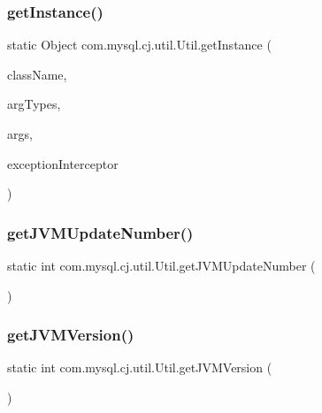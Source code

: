 \subsubsection{\texorpdfstring{get\+Instance()}{getInstance()}\hspace{0.1cm}{\footnotesize\ttfamily [2/2]}}
{\footnotesize\ttfamily static Object com.\+mysql.\+cj.\+util.\+Util.\+get\+Instance (\begin{DoxyParamCaption}\item[{String}]{class\+Name,  }\item[{Class$<$?$>$ \mbox{[}$\,$\mbox{]}}]{arg\+Types,  }\item[{Object \mbox{[}$\,$\mbox{]}}]{args,  }\item[{\mbox{\hyperlink{interfacecom_1_1mysql_1_1cj_1_1exceptions_1_1_exception_interceptor}{Exception\+Interceptor}}}]{exception\+Interceptor }\end{DoxyParamCaption})\hspace{0.3cm}{\ttfamily [static]}}

\mbox{\label{classcom_1_1mysql_1_1cj_1_1util_1_1_util_a34479078f5d6fd33e4b2ca262144ec25}} 
\subsubsection{\texorpdfstring{get\+J\+V\+M\+Update\+Number()}{getJVMUpdateNumber()}}
{\footnotesize\ttfamily static int com.\+mysql.\+cj.\+util.\+Util.\+get\+J\+V\+M\+Update\+Number (\begin{DoxyParamCaption}{ }\end{DoxyParamCaption})\hspace{0.3cm}{\ttfamily [static]}}

\mbox{\label{classcom_1_1mysql_1_1cj_1_1util_1_1_util_a8a0cafdd6a8954f0e9f56d53b20891f0}} 
\subsubsection{\texorpdfstring{get\+J\+V\+M\+Version()}{getJVMVersion()}}
{\footnotesize\ttfamily static int com.\+mysql.\+cj.\+util.\+Util.\+get\+J\+V\+M\+Version (\begin{DoxyParamCaption}{ }\end{DoxyParamCaption})\hspace{0.3cm}{\ttfamily [static]}}


